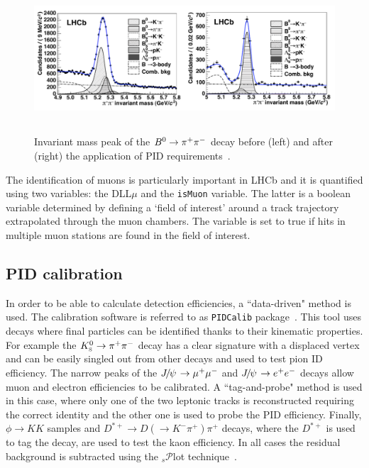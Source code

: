 \begin{figure}[h!]
\centering
\includegraphics[width=1.\textwidth,height=5.5cm]{Detector/figs/pid_peaks.png}
\caption{Invariant mass peak of the $\Bz\to\pi^+\pi^-$ decay before (left) and
after (right) the application of PID requirements~\cite{Aaij:1978280}. }
\label{fig:pid_peaks}
\end{figure}

The identification of muons is particularly important in LHCb and it is quantified using two variables: the DLL$\mu$
and the \verb!isMuon! variable. The latter is a boolean variable determined by defining a `field of interest' around 
a track trajectory extrapolated through the muon chambers. The variable is set to true if hits in multiple muon stations are 
found in the field of interest.

\subsection{PID calibration}
\label{sec:PID_calib}

In order to be able to calculate detection efficiencies, a ``data-driven" method is used.
The calibration software is referred to as \verb!PIDCalib! package~\cite{Aaij:1978280}. 
This tool uses decays where final  particles can be identified thanks to their kinematic properties.
For example the $\KS\to\pi^+\pi^-$ decay has a clear signature with a displaced vertex
and can be easily singled out from other decays and used to test pion ID efficiency.
The narrow peaks of the $\jpsi\to\mumu$ and $\jpsi\to\ee$ decays allow
muon and electron efficiencies to be calibrated. A ``tag-and-probe" method is used in this case, 
where only one of the two leptonic tracks is reconstructed requiring the correct identity and the other
one is used to probe the PID efficiency. Finally,  $\phi\to KK$ samples and 
$D^{*+}\to D(\to K^-\pi^+)\pi^+$ decays, where the $D^{*+}$ is used to tag the decay,
are used to test the kaon efficiency. In all cases the residual background is subtracted using
the $_s\mathcal{P}$lot technique~\cite{sPlot}.


